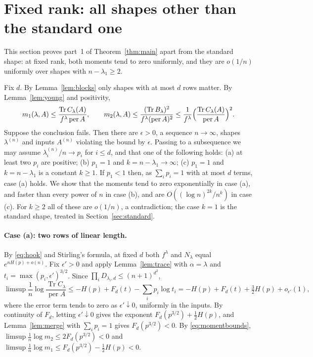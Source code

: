 \documentclass[11pt,a4paper]{article}
\theoremstyle{remark}
\newcommand{\per}{\operatorname{per}}
\newcommand{\Tr}{\operatorname{Tr}}
\begin{document}
\section{Fixed rank: all shapes other than the standard one}\label{sec:fixed}
This section proves part~1 of Theorem~\ref{thm:main} apart from the standard shape: at fixed rank, both moments tend to zero uniformly, and they are $o(1/n)$ uniformly over shapes with $n-\lambda_1\ge2$.

Fix $d$. By Lemma~\ref{lem:blocks} only shapes with at most $d$ rows matter. By Lemma~\ref{lem:young} and positivity,
\begin{equation}\label{eq:momentbounds}
 m_1(\lambda,A)\le\frac{\Tr C_\lambda(A)}{f^\lambda\per A},\qquad
 m_2(\lambda,A)\le\frac{(\Tr B_\lambda)^2}{f^\lambda(\per A)^2}\le\frac{1}{f^\lambda}\Bigl(\frac{\Tr C_\lambda(A)}{\per A}\Bigr)^2 .
\end{equation}
Suppose the conclusion fails. Then there are $\epsilon>0$, a sequence $n\to\infty$, shapes $\lambda^{(n)}$ and inputs $A^{(n)}$ violating the bound by $\epsilon$. Passing to a subsequence we may assume $\lambda_i^{(n)}/n\to p_i$ for $i\le d$, and that one of the following holds: (a) at least two $p_i$ are positive; (b) $p_1=1$ and $k=n-\lambda_1\to\infty$; (c) $p_1=1$ and $k=n-\lambda_1$ is a constant $k\ge1$. If $p_1<1$ then, as $\sum_ip_i=1$ with at most $d$ terms, case (a) holds. We show that the moments tend to zero exponentially in case (a), and faster than every power of $n$ in case (b), and are $O((\log n)^{2k}/n^k)$ in case (c). For $k\ge2$ all of these are $o(1/n)$, a contradiction; the case $k=1$ is the standard shape, treated in Section~\ref{sec:standard}.

\paragraph{Case (a): two rows of linear length.} By \eqref{eq:hook} and Stirling's formula, at fixed $d$ both $f^\lambda$ and $N_\lambda$ equal $e^{nH(p)+o(n)}$. Fix $\epsilon'>0$ and apply Lemma~\ref{lem:trace} with $\alpha=\lambda$ and $t_i=\max(p_i,\epsilon')^{3/2}$. Since $\prod_iD_{\lambda_i,d}\le(n+1)^{d^2}$,
\[
 \limsup\frac1n\log\frac{\Tr C_\lambda}{\per A}\le-H(p)+F_d(t)-\sum_ip_i\log t_i
 =-H(p)+F_d(t)+\tfrac32H(p)+o_{\epsilon'}(1),
\]
where the error term tends to zero as $\epsilon'\downarrow0$, uniformly in the inputs. By continuity of $F_d$, letting $\epsilon'\downarrow0$ gives the exponent $F_d(p^{3/2})+\frac12H(p)$, and Lemma~\ref{lem:merge} with $\sum_ip_i=1$ gives $F_d(p^{3/2})<0$. By \eqref{eq:momentbounds}, $\limsup\frac1n\log m_2\le2F_d(p^{3/2})<0$ and $\limsup\frac1n\log m_1\le F_d(p^{3/2})-\frac12H(p)<0$.
\end{document}
